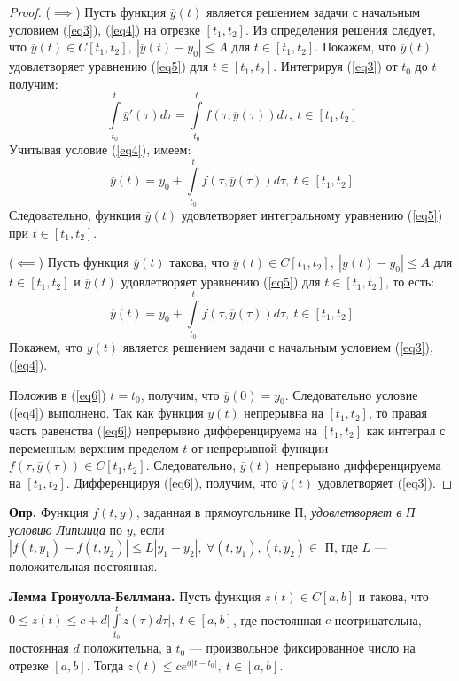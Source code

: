 \begin{proof} ($\implies$) Пусть функция $\overline{y}(t)$ является решением задачи с начальным условием (\ref{eq3}), (\ref{eq4}) на отрезке $[t_1, t_2]$. Из определения решения следует, что $\overline{y}(t) \in C[t_1,t_2],~|\overline{y}(t)-y_0| \leqslant A$ для $t \in [t_1,t_2]$. Покажем, что $\overline{y}(t)$ удовлетворяет уравнению (\ref{eq5}) для $t \in [t_1, t_2]$. Интегрируя (\ref{eq3}) от $t_0$ до $t$ получим:
$$ \int\limits_{t_0}^{t}\overline{y}'(\tau)d\tau = \int\limits_{t_0}^{t}f(\tau, \overline{y}(\tau))d\tau,~t\in[t_1,t_2]$$
Учитывая условие (\ref{eq4}), имеем:
$$ \overline{y}(t) = y_0 + \int\limits_{t_0}^{t}f(\tau, \overline{y}(\tau))d\tau,~t\in[t_1,t_2]$$
Следовательно, функция $\overline{y}(t)$ удовлетворяет интегральному уравнению (\ref{eq5}) при $t \in [t_1, t_2]$.

($\impliedby$) Пусть функция $\overline{y}(t)$ такова, что $\overline{y}(t) \in C[t_1, t_2],~|y(t) - y_0| \leqslant A$ для $t \in [t_1, t_2]$ и $\overline{y}(t)$ удовлетворяет уравнению (\ref{eq5}) для $t \in [t_1, t_2]$, то есть:
\begin{equation}
    \overline{y}(t) = y_0 + \int\limits_{t_0}^{t}f(\tau, \overline{y}(\tau))d\tau,~t\in[t_1,t_2]
    \label{eq6}
\end{equation}
Покажем, что $y(t)$ является решением задачи с начальным условием (\ref{eq3}), (\ref{eq4}). 

Положив в (\ref{eq6}) $t = t_0$, получим, что $\overline{y}(0) = y_0$. Следовательно условие (\ref{eq4}) выполнено. Так как функция $\overline{y}(t)$ непрерывна на $[t_1,t_2]$, то правая часть равенства (\ref{eq6}) непрерывно дифференцируема на $[t_1, t_2]$ как интеграл с переменным верхним пределом $t$ от непрерывной функции $f(\tau,\overline{y}(\tau)) \in C[t_1,t_2]$. Следовательно, $\overline{y}(t)$ непрерывно дифференцируема на $[t_1, t_2]$. Дифференцируя (\ref{eq6}), получим, что $\overline{y}(t)$ удовлетворяет (\ref{eq3}).
\end{proof}

\textbf{Опр.} Функция $f(t,y)$, заданная в прямоугольнике П, \textit{удовлетворяет в П условию Липшица} по $y$, если $|f(t,y_1)-f(t,y_2)| \leqslant L|y_1 -y_2|,~\forall(t,y_1),(t,y_2) \in$ П, где $L$ --- положительная постоянная.

\textbf{Лемма Гронуолла-Беллмана.} Пусть функция $z(t) \in C[a,b]$ и такова, что $0 \leqslant z(t) \leqslant c+d \Big|\int\limits_{t_0}^{t}z(\tau)d\tau\Big|,~t\in[a, b]$, где постоянная $c$ неотрицательна, постоянная $d$ положительна, а $t_0$ --- произвольное фиксированное число на отрезке $[a, b]$. Тогда $z(t) \leqslant c e^{d|t-t_0|},~t \in [a, b]$.

